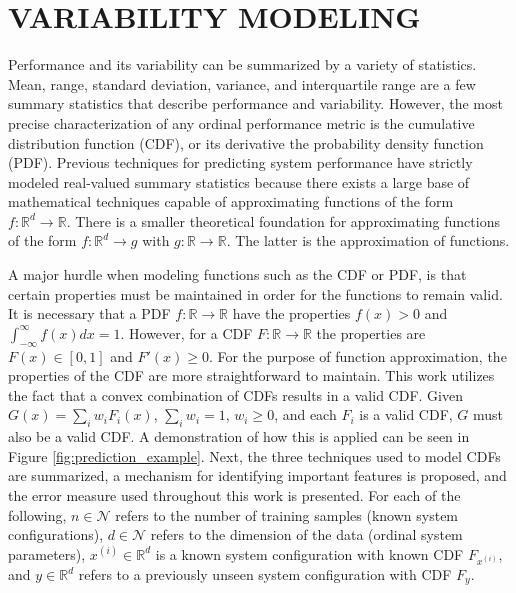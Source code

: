 \documentclass[letterpaper, 10 pt, conference]{ieeeconf}  %
\begin{document}
\section{VARIABILITY MODELING}
\label{sec:variability_modeling}

Performance and its variability can be summarized by a variety of statistics. Mean, range, standard deviation, variance, and interquartile range are a few summary statistics that describe performance and variability. However, the most precise characterization of any ordinal performance metric is the cumulative distribution function (CDF), or its derivative the probability density function (PDF). Previous techniques for predicting system performance have strictly modeled real-valued summary statistics because there exists a large base of mathematical techniques capable of approximating functions of the form $f: \mathbb{R}^d \rightarrow \mathbb{R}$. There is a smaller theoretical foundation for approximating functions of the form $f: \mathbb{R}^d \rightarrow g$ with $g: \mathbb{R} \rightarrow \mathbb{R}$. The latter is the approximation of functions.

A major hurdle when modeling functions such as the CDF or PDF, is that certain properties must be maintained in order for the functions to remain valid. It is necessary that a PDF $f: \mathbb{R} \rightarrow \mathbb{R}$ have the properties $f(x) > 0$ and $\int_{-\infty}^{\infty}f(x)dx = 1$. However, for a CDF $F: \mathbb{R} \rightarrow \mathbb{R}$ the properties are $F(x) \in [0,1]$ and $F'(x) \geq 0$. For the purpose of function approximation, the properties of the CDF are more straightforward to maintain. This work utilizes the fact that a convex combination of CDFs results in a valid CDF. Given $G(x) = \sum_{i}w_i F_i(x)$, $\sum_{i} w_i = 1$, $w_i \geq 0$, and each $F_i$ is a valid CDF, $G$ must also be a valid CDF. A demonstration of how this is applied can be seen in Figure \ref{fig:prediction_example}. Next, the three techniques used to model CDFs are summarized, a mechanism for identifying important features is proposed, and the error measure used throughout this work is presented. For each of the following, $n \in \mathcal{N}$ refers to the number of training samples (known system configurations), $d \in \mathcal{N}$ refers to the dimension of the data (ordinal system parameters), $x^{(i)} \in \mathbb{R}^d$ is a known system configuration with known CDF $F_{x^{(i)}}$, and $y \in \mathbb{R}^d$ refers to a previously unseen system configuration with CDF $F_y$.
\end{document}
